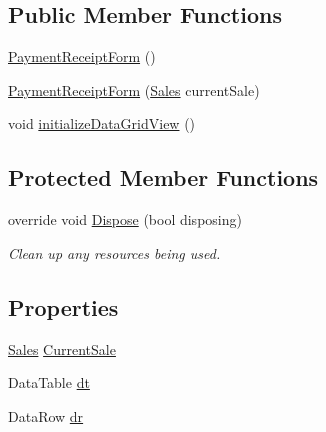 \subsection*{Public Member Functions}
\begin{DoxyCompactItemize}
\item 
\hyperlink{class_health___assignment_1_1_payment_receipt_form_a80e16dd3f32f94cba67802a528d54143}{Payment\+Receipt\+Form} ()
\item 
\hyperlink{class_health___assignment_1_1_payment_receipt_form_a032a25494d599ed41109e7caeaa25261}{Payment\+Receipt\+Form} (\hyperlink{class_health___assignment_1_1_sales}{Sales} current\+Sale)
\item 
void \hyperlink{class_health___assignment_1_1_payment_receipt_form_a8cce0ed088597986b9012c3962c3b922}{initialize\+Data\+Grid\+View} ()
\end{DoxyCompactItemize}
\subsection*{Protected Member Functions}
\begin{DoxyCompactItemize}
\item 
override void \hyperlink{class_health___assignment_1_1_payment_receipt_form_af9d855a0b688db1f718eca0b7cf263b2}{Dispose} (bool disposing)
\begin{DoxyCompactList}\small\item\em Clean up any resources being used. \end{DoxyCompactList}\end{DoxyCompactItemize}
\subsection*{Properties}
\begin{DoxyCompactItemize}
\item 
\hyperlink{class_health___assignment_1_1_sales}{Sales} \hyperlink{class_health___assignment_1_1_payment_receipt_form_a2c9bbeef0e65434e8e2b3853b55376ab}{Current\+Sale}
\item 
Data\+Table \hyperlink{class_health___assignment_1_1_payment_receipt_form_ab91bf03da8404b8fcef1226269bff3e0}{dt}
\item 
Data\+Row \hyperlink{class_health___assignment_1_1_payment_receipt_form_aec6fd34278228e54b555ea054f4b20d8}{dr}
\end{DoxyCompactItemize}


